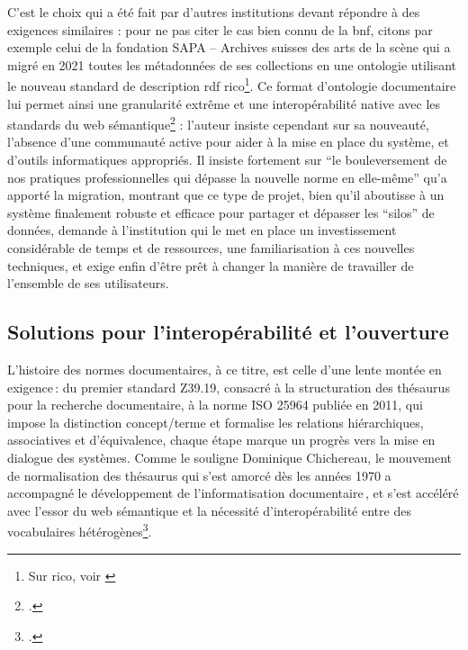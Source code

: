 C'est le choix qui a été fait par d'autres institutions devant répondre à des exigences similaires : pour ne pas citer le cas bien connu de la \ac{bnf}, citons par exemple celui de la fondation SAPA -- Archives suisses des arts de la scène qui a migré en 2021 toutes les métadonnées de ses collections en une ontologie utilisant le nouveau standard de description \ac{rdf} \ac{rico}\footnote{Sur \ac{rico}, voir \cite{bruleauxRecordsContextsRIC2024}}. Ce format d'ontologie documentaire lui permet ainsi une granularité extrême et une interopérabilité native avec les standards du web sémantique\footcite{coulonDeploiementNormeRecords2024} : l'auteur insiste cependant sur sa nouveauté, l'absence d'une communauté active pour aider à la mise en place du système, et d'outils informatiques appropriés. Il insiste fortement sur \enquote{le bouleversement de nos pratiques professionnelles qui dépasse la nouvelle norme en elle-même} qu'a apporté la migration, montrant que ce type de projet, bien qu'il aboutisse à un système finalement robuste et efficace pour partager et dépasser les \enquote{silos} de données, demande à l'institution qui le met en place un investissement considérable de temps et de ressources, une familiarisation à ces nouvelles techniques, et exige enfin d'être prêt à changer la manière de travailler de l'ensemble de ses utilisateurs.

\subsection{Solutions pour l’interopérabilité et l’ouverture}


L’histoire des normes documentaires, à ce titre, est celle d’une lente montée en exigence : du premier standard Z39.19, consacré à la structuration des thésaurus pour la recherche documentaire, à la norme ISO 25964 publiée en 2011, qui impose la distinction concept/terme et formalise les relations hiérarchiques, associatives et d’équivalence, chaque étape marque un progrès vers la mise en dialogue des systèmes. Comme le souligne Dominique Chichereau, le mouvement de normalisation des thésaurus qui s'est amorcé dès les années 1970 a accompagné le développement de l’informatisation documentaire , et s’est accéléré avec l’essor du web sémantique et la nécessité d'interopérabilité entre des vocabulaires hétérogènes\footcite{chichereauNormesConceptionGestion2007}.


